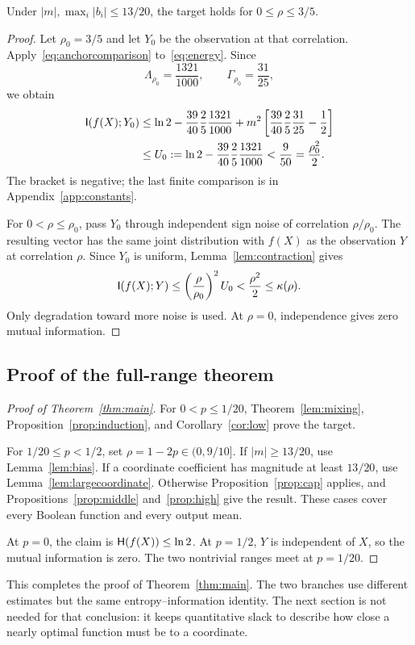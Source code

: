 \begin{proposition}\label{prop:high}
Under $|m|,\max_i|b_i|\le13/20$, the target holds for $0\le\rho\le3/5$.
\end{proposition}
\begin{proof}
Let $\rho_0=3/5$ and let $Y_0$ be the observation at that correlation. Apply~\eqref{eq:anchorcomparison} to~\eqref{eq:energy}. Since
\[
\Lambda_{\rho_0}=\frac{1321}{1000},\qquad
\Gamma_{\rho_0}=\frac{31}{25},
\]
we obtain
\begin{align*}
\mathsf I(f(X);Y_0)
&\le\ln2-\frac{39}{40}\frac25\frac{1321}{1000}
+m^2\left[\frac{39}{40}\frac25\frac{31}{25}-\frac12\right]\\
&\le U_0:=\ln2-\frac{39}{40}\frac25\frac{1321}{1000}
<\frac9{50}=\frac{\rho_0^2}{2}.
\end{align*}
The bracket is negative; the last finite comparison is in Appendix~\ref{app:constants}.

For $0<\rho\le\rho_0$, pass $Y_0$ through independent sign noise of correlation $\rho/\rho_0$. The resulting vector has the same joint distribution with $f(X)$ as the observation $Y$ at correlation $\rho$. Since $Y_0$ is uniform, Lemma~\ref{lem:contraction} gives
\[
\mathsf I(f(X);Y)\le\left(\frac{\rho}{\rho_0}\right)^2U_0
<\frac{\rho^2}{2}\le\kappa(\rho).
\]
Only degradation toward more noise is used. At $\rho=0$, independence gives zero mutual information.
\end{proof}

\subsection{Proof of the full-range theorem}\label{sec:completion}
\begin{proof}[Proof of Theorem~\ref{thm:main}]
For $0<p\le1/20$, Theorem~\ref{lem:mixing}, Proposition~\ref{prop:induction}, and Corollary~\ref{cor:low} prove the target.

For $1/20\le p<1/2$, set $\rho=1-2p\in(0,9/10]$. If $|m|\ge13/20$, use Lemma~\ref{lem:bias}. If a coordinate coefficient has magnitude at least $13/20$, use Lemma~\ref{lem:largecoordinate}. Otherwise Proposition~\ref{prop:cap} applies, and Propositions~\ref{prop:middle} and~\ref{prop:high} give the result. These cases cover every Boolean function and every output mean.

At $p=0$, the claim is $\mathsf H(f(X))\le\ln2$. At $p=1/2$, $Y$ is independent of $X$, so the mutual information is zero. The two nontrivial ranges meet at $p=1/20$.
\end{proof}


This completes the proof of Theorem~\ref{thm:main}. The two branches use different estimates but the same entropy--information identity. The next section is not needed for that conclusion: it keeps quantitative slack to describe how close a nearly optimal function must be to a coordinate.
